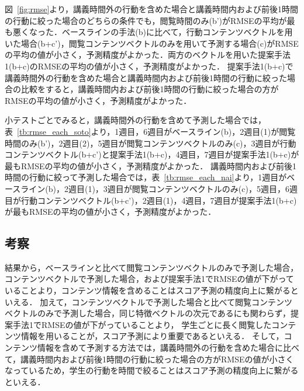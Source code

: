 \documentclass[a4paper,12pt]{ltjsreport}
\begin{document}
図~\ref{fig:rmse}より，講義時間外の行動を含めた場合と講義時間内および前後1時間の行動に絞った場合のどちらの条件でも，閲覧時間のみ(b')がRMSEの平均が最も悪くなった．ベースラインの手法(b)に比べて，行動コンテンツベクトルを用いた場合(b+c')，閲覧コンテンツベクトルのみを用いて予測する場合(c)がRMSEの平均の値が小さく，予測精度がよかった．両方のベクトルを用いた提案手法1(b+c)のRMSEの平均の値が小さく，予測精度がよかった．
提案手法1(b+c)で講義時間外の行動を含めた場合と講義時間内および前後1時間の行動に絞った場合の比較をすると，講義時間内および前後1時間の行動に絞った場合の方がRMSEの平均の値が小さく，予測精度がよかった．

小テストごとでみると，講義時間外の行動を含めて予測した場合では，表~\ref{tb:rmse_each_soto}より，1週目，6週目がベースライン(b)，2週目(1)が閲覧時間のみ(b')，2週目(2)，5週目が閲覧コンテンツベクトルのみ(c)，3週目が行動コンテンツベクトル(b+c')と提案手法1(b+c)，4週目，7週目が提案手法1(b+c)が最もRMSEの平均の値が小さく，予測精度がよかった．
講義時間内および前後1時間の行動に絞って予測した場合では，表~\ref{tb:rmse_each_nai}より，1週目がベースライン(b)，2週目(1)，3週目が閲覧コンテンツベクトルのみ(c)，5週目，6週目が行動コンテンツベクトル(b+c')，2週目(1)，4週目，7週目が提案手法1(b+c)が最もRMSEの平均の値が小さく，予測精度がよかった．

\subsection{考察}
結果から，ベースラインと比べて閲覧コンテンツベクトルのみで予測した場合，コンテンツベクトルで予測した場合，および提案手法1でRMSEの値が下がっていることより，コンテンツ情報を含めることはスコア予測の精度向上に繋がるといえる．
加えて，コンテンツベクトルで予測した場合と比べて閲覧コンテンツベクトルのみで予測した場合，同じ特徴ベクトルの次元であるにも関わらず，提案手法1でRMSEの値が下がっていることより，
学生ごとに長く閲覧したコンテンツ情報を用いることが，スコア予測により重要であるといえる．
そして，コンテンツ情報を含めて予測する方法では，講義時間外の行動を含めた場合に比べて，講義時間内および前後1時間の行動に絞った場合の方がRMSEの値が小さくなっているため，学生の行動を時間で絞ることはスコア予測の精度向上に繋がるといえる．
\end{document}

